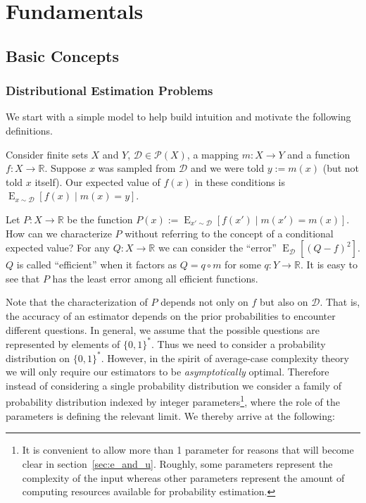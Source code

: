 \documentclass[11pt]{article}
\numberwithin{equation}{section}
\theoremstyle{definition}
\theoremstyle{plain}
\newcommand{\Bool}{\{0,1\}}
\newcommand{\Words}{{\Bool^*}}
\DeclareMathOperator{\E}{E}
\newcommand{\Reals}{\mathbb{R}}
\newcommand{\Dist}{\mathcal{D}}
\begin{document}
\section{Fundamentals}
\label{sec:fundamentals}

\subsection{Basic Concepts}

\subsubsection{Distributional Estimation Problems}

We start with a simple model to help build intuition and motivate the following definitions.

Consider finite sets $X$ and $Y$, $\Dist \in \mathcal{P}(X)$, a mapping $m: X \rightarrow Y$ and a function $f: X \rightarrow \Reals$. Suppose $x$ was sampled from $\Dist$ and we were told $y := m(x)$ (but not told $x$ itself). Our expected value of $f(x)$ in these conditions is ${\E_{x \sim \Dist}[f(x) \mid m(x) = y]}$.

Let $P: X \rightarrow \Reals$ be the function $P(x) := \E_{x' \sim \Dist}[f(x') \mid m(x') = m(x)]$. How can we characterize $P$ without referring to the concept of a conditional expected value? For any $Q: X \rightarrow \Reals$ we can consider the \enquote{error} $\E_\Dist[(Q - f)^2]$. $Q$ is called \enquote{efficient} when it factors as $Q = q \circ m$ for some $q: Y \rightarrow \Reals$. It is easy to see that $P$ has the least error among all efficient functions.

Note that the characterization of $P$ depends not only on $f$ but also on $\Dist$. That is, the accuracy of an estimator depends on the prior probabilities to encounter different questions. In general, we assume that the possible questions are represented by elements of $\Words$. Thus we need to consider a probability distribution on $\Words$. However, in the spirit of average-case complexity theory we will only require our estimators to be \emph{asymptotically} optimal. Therefore instead of considering a single probability distribution we consider a family of probability distribution indexed by integer parameters\footnote{It is convenient to allow more than 1 parameter for reasons that will become clear in section~\ref{sec:e_and_u}. Roughly, some parameters represent the complexity of the input whereas other parameters represent the amount of computing resources available for probability estimation.}, where the role of the parameters is defining the relevant limit. We thereby arrive at the following:
\end{document}
